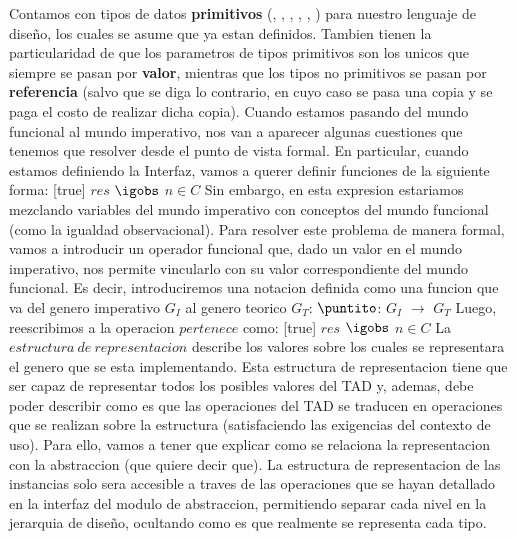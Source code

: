\documentclass[10pt,a4paper]{article}
\begin{document}
\newline
\newline
Contamos con tipos de datos \textbf{primitivos} (, , , , , ) para nuestro lenguaje de diseño, los cuales se asume que ya estan definidos. Tambien tienen la particularidad de que los parametros de tipos primitivos son los unicos que siempre se pasan por \textbf{valor}, mientras que los tipos no primitivos se pasan por \textbf{referencia} (salvo que se diga lo contrario, en cuyo caso se pasa una copia y se paga el costo de realizar dicha copia).
\newline
\newline
Cuando estamos pasando del mundo funcional al mundo imperativo, nos van a aparecer algunas
cuestiones que tenemos que resolver desde el punto de vista formal. En particular, cuando estamos definiendo la Interfaz, vamos a querer definir funciones de la siguiente forma:
\newline
\newline
{}%
[true]
{$res$ $\igobs$ $n \in C$}%
\newline
\newline
Sin embargo, en esta expresion estariamos mezclando variables del mundo imperativo con conceptos del mundo funcional (como la igualdad observacional). Para resolver este problema de manera formal, vamos a introducir un operador funcional que, dado un valor en el mundo imperativo, nos permite vincularlo con su valor correspondiente del mundo funcional. Es decir, introduciremos una notacion definida como una funcion que va del genero imperativo $G_{I}$ al genero teorico $G_{T}$:
\newline
\newline
$\puntito$: $G_{I}$ $\rightarrow$ $G_{T}$
\newline
\newline
Luego, reescribimos a la operacion $pertenece$ como:
\newline
\newline
{}%
[true]
{$res$ $\igobs$ $n \in C$}%
\newline
\newline
La $estructura~de~representacion$ describe los valores sobre los cuales se representara el genero que se esta implementando. Esta estructura de representacion tiene que ser capaz de representar todos los posibles valores del TAD y, ademas, debe poder describir como es que las operaciones del TAD se traducen en operaciones que se realizan sobre la estructura (satisfaciendo las exigencias del contexto de uso). Para ello, vamos a tener que explicar como se relaciona la representacion con la abstraccion (que quiere decir que). La estructura de representacion de las instancias solo sera accesible a traves de las operaciones que se hayan detallado en la interfaz del modulo de abstraccion, permitiendo separar cada nivel en la jerarquia de diseño, ocultando como es que realmente se representa cada tipo.
\end{document}
